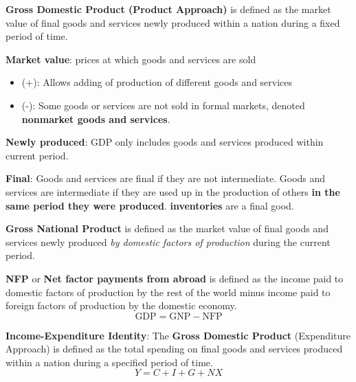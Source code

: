 \documentclass[letterpaper, 9pt,landscape]{extarticle}
\begin{document}
\raggedright
\footnotesize

\begin{multicols*}{5}
\setlength{\premulticols}{1pt}
\setlength{\postmulticols}{1pt}
\setlength{\multicolsep}{1pt}
\setlength{\columnsep}{2pt}

\begin{definition}
    \textbf{Gross Domestic Product (Product Approach)} is defined as the market value of final goods and services newly produced within a nation during a fixed period of time.
\end{definition}

\textbf{Market value}: prices at which goods and services are sold
\begin{itemize}
    \item (+): Allows adding of production of different goods and services
    \item (-): Some goods or services are not sold in formal markets, denoted \textbf{nonmarket goods and services}.
\end{itemize}

\textbf{Newly produced}: GDP only includes goods and services produced within current period.

\textbf{Final}: Goods and services are final if they are not intermediate. Goods and services are intermediate if they are used up in the production of others \textbf{in the same period they were produced}. \textbf{inventories} are a final good. 

\begin{definition}
    \textbf{Gross National Product} is defined as the market value of final goods and services newly produced \textit{by domestic factors of production} during the current period.
\end{definition}

\begin{definition}
    \textbf{NFP} or \textbf{Net factor payments from abroad} is defined as the income paid to domestic factors of production by the rest of the world minus income paid to foreign factors of production by the domestic economy.
    \[
        \text{GDP} = \text{GNP} - \text{NFP}
    \]
\end{definition}

\begin{definition}
    \textbf{Income-Expenditure Identity}: The \textbf{Gross Domestic Product} (Expenditure Approach) is defined as the total spending on final goods and services produced within a nation during a specified period of time. 
    \[
        Y = C + I + G + NX
    \]
\end{definition}



\end{multicols*}
\end{document}
